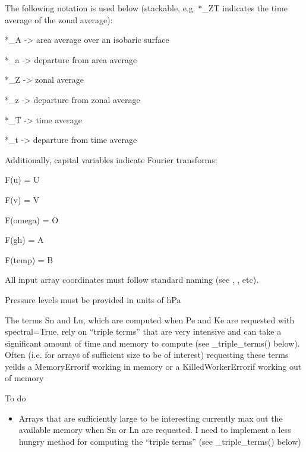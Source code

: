 \documentclass[letterpaper,10pt,english]{sphinxmanual}
\begin{document}
\begin{fulllineitems}
\begin{DUlineblock}{0em}
\item[] The following notation is used below (stackable, e.g. *\_ZT indicates the time average of the zonal average):
\item[] *\_A -\textgreater{} area average over an isobaric surface
\item[] *\_a -\textgreater{} departure from area average
\item[] *\_Z -\textgreater{} zonal average
\item[] *\_z -\textgreater{} departure from zonal average
\item[] *\_T -\textgreater{} time average
\item[] *\_t -\textgreater{} departure from time average
\item[] Additionally, capital variables indicate Fourier transforms:
\item[] F(u) = U
\item[] F(v) = V
\item[] F(omega) = O
\item[] F(gh) = A
\item[] F(temp) = B
\end{DUlineblock}

\begin{DUlineblock}{0em}
\item[] All input array coordinates must follow standard naming (see ,                 , etc).
\item[] Pressure levels must be provided in units of hPa
\item[] The terms Sn and Ln, which are computed when Pe and Ke are requested with spectral=True,                 rely on “triple terms” that are very intensive and can take a significant amount of time                 and memory to compute (see \_triple\_terms() below). Often (i.e. for arrays of sufficient                 size to be of interest) requesting these terms yeilds a MemoryError\textendash{}if working in memory                \textendash{}or a KilledWorkerError\textendash{}if working out of memory
\end{DUlineblock}

To do
\begin{itemize}
\item {} 
Arrays that are sufficiently large to be interesting currently max out the available memory when                 Sn or Ln are requested. I need to implement a less hungry method for computing the “triple terms”                 (see \_triple\_terms() below)


\end{itemize}
\end{fulllineitems}
\end{document}
